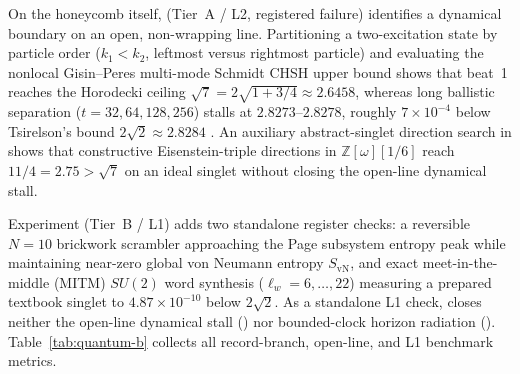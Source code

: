 On the honeycomb itself,  (Tier~A / L2, registered failure) identifies a dynamical boundary on an
open, non-wrapping line. Partitioning a two-excitation state by particle order ($k_1 < k_2$, leftmost versus
rightmost particle) and evaluating the nonlocal Gisin--Peres multi-mode Schmidt CHSH upper bound shows that beat~1
reaches the Horodecki ceiling $\sqrt{7} = 2\sqrt{1 + 3/4} \approx 2.6458$, whereas long ballistic separation
($t = 32, 64, 128, 256$) stalls at $2.8273$--$2.8278$, roughly $7 \times 10^{-4}$ below Tsirelson's bound
$2\sqrt{2} \approx 2.8284$ \cite{tsirelson1980}. An auxiliary abstract-singlet direction search in 
shows that constructive Eisenstein-triple directions in $\mathbb{Z}[\omega][1/6]$ reach $11/4 = 2.75 > \sqrt{7}$ on an
ideal singlet without closing the open-line dynamical stall.

Experiment  (Tier~B / L1) adds two standalone register checks: a reversible $N = 10$ brickwork
scrambler approaching the Page subsystem entropy peak \cite{page1993} while maintaining near-zero global von Neumann
entropy $S_{\mathrm{vN}}$, and exact  meet-in-the-middle (MITM) $SU(2)$ word synthesis
($\ell_w = 6, \ldots, 22$) measuring a prepared textbook singlet to $4.87 \times 10^{-10}$ below $2\sqrt{2}$. As a
standalone L1 check,  closes neither the open-line dynamical stall () nor
bounded-clock horizon radiation (). Table~\ref{tab:quantum-b} collects all record-branch, open-line,
and L1 benchmark metrics.

